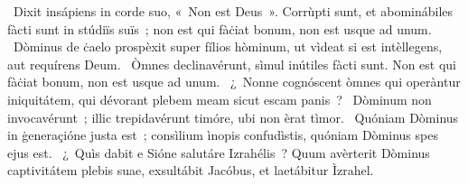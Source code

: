 ~Dixit insápiens in corde suo, «~Non est Deus~». Corrùpti sunt, et abominábiles fàcti sunt in stúdiïs suïs~; non est qui fàċiat bonum, non est usque ad unum. 
~Dòminus de ċaelo prospèxit super fílios hòminum, ut vìdeat si est intèllegens, aut requírens Deum. 
~Òmnes declinavérunt, sìmul inútiles fàcti sunt. Non est qui fàċiat bonum, non est usque ad unum. 
~¿~Nonne cognóscent òmnes qui operàntur iniquitátem, qui dévorant plebem meam sicut escam panis~? 
~Dòminum non invocavérunt~; illic trepidavérunt timóre, ubi non èrat tìmor. 
~Quóniam Dòminus in ġeneraçióne justa est~; consìlium ìnopis confudìstis, quóniam Dòminus spes ejus est. 
~¿~Quìs dabit e Sióne salutáre Izrahélis~? Quum avèrterit Dòminus captivitátem plebis suae, exsultábit Jacóbus, et laetábitur Ìzrahel. 
